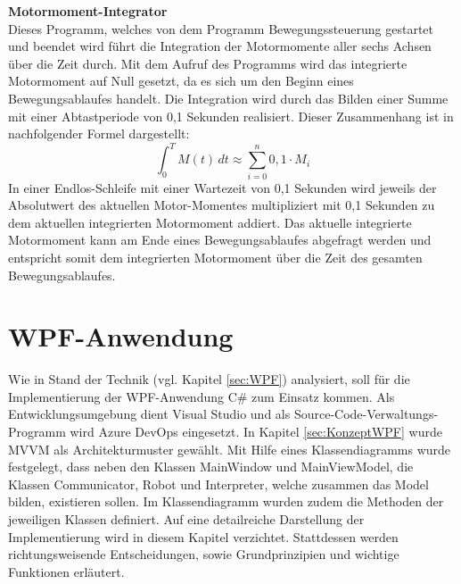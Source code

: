 \documentclass[ a4paper,
                oneside,
                toc=bibliography,
                toc=listof
                ]{scrbook}
\begin{document}
	\textbf{Motormoment-Integrator}\\
	Dieses Programm, welches von dem Programm Bewegungssteuerung gestartet und beendet wird führt die Integration der Motormomente aller sechs Achsen über die Zeit durch. Mit dem Aufruf des Programms wird das integrierte Motormoment auf Null gesetzt, da es sich um den Beginn eines Bewegungsablaufes handelt. Die Integration wird durch das Bilden einer Summe mit einer Abtastperiode von 0,1 Sekunden realisiert. Dieser Zusammenhang ist in nachfolgender Formel dargestellt:
	\begin{equation}
		\int_{0}^{T} M(t) \, dt \approx \sum_{i=0}^{n} 0,1 \cdot M_i
	\end{equation}
	In einer Endlos-Schleife mit einer Wartezeit von 0,1 Sekunden wird jeweils der Absolutwert des aktuellen Motor-Momentes multipliziert mit 0,1 Sekunden zu dem aktuellen integrierten Motormoment addiert. Das aktuelle integrierte Motormoment kann am Ende eines Bewegungsablaufes abgefragt werden und entspricht somit dem integrierten Motormoment über die Zeit des gesamten Bewegungsablaufes.
	\section{WPF-Anwendung}
	Wie in Stand der Technik (vgl. Kapitel \ref{sec:WPF}) analysiert, soll für die Implementierung der WPF-Anwendung C\# zum Einsatz kommen. Als Entwicklungsumgebung dient Visual Studio und als Source-Code-Verwaltungs-Programm wird \glqq Azure DevOps\grqq{} eingesetzt. In Kapitel \ref{sec:KonzeptWPF} wurde MVVM als Architekturmuster gewählt. Mit Hilfe eines Klassendiagramms wurde festgelegt, dass neben den Klassen MainWindow und MainViewModel, die Klassen Communicator, Robot und Interpreter, welche zusammen das Model bilden, existieren sollen. Im Klassendiagramm wurden zudem die Methoden der jeweiligen Klassen definiert. Auf eine detailreiche Darstellung der Implementierung wird in diesem Kapitel verzichtet. Stattdessen werden richtungsweisende Entscheidungen, sowie Grundprinzipien und wichtige Funktionen erläutert.
\end{document}
